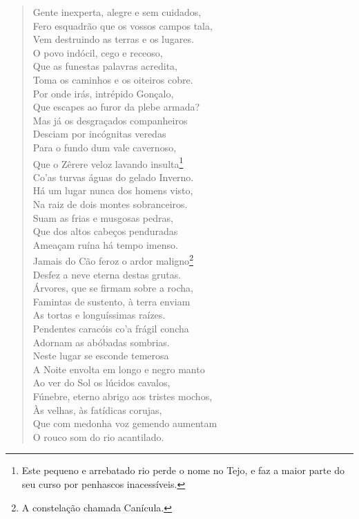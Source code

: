 \begin{verse}
Gente inexperta, alegre e sem cuidados,\\
Fero esquadrão que os vossos campos tala,\\
Vem destruindo as terras e os lugares.\\
O povo indócil, cego e receoso,\\
Que as funestas palavras acredita,\\
Toma os caminhos e os oiteiros cobre.\\
Por onde irás, intrépido Gonçalo,\\
Que escapes ao furor da plebe armada?\\
Mas já os desgraçados companheiros\\
Desciam por incógnitas veredas\\
Para o fundo dum vale cavernoso,\\
Que o Zêrere veloz lavando insulta\footnote{ Este pequeno e arrebatado
rio perde o nome no Tejo, e faz a maior parte do seu curso por penhascos inacessíveis.}\\
Co'as turvas águas do gelado Inverno.\\
Há um lugar nunca dos homens visto,\\
Na raiz de dois montes sobranceiros.\\
Suam as frias e musgosas pedras,\\
Que dos altos cabeços penduradas\\
Ameaçam ruína há tempo imenso.\\
Jamais do Cão feroz o ardor maligno\footnote{ A constelação chamada Canícula.}\\		\index{\Canic}
Desfez a neve eterna destas grutas.\\
Árvores, que se firmam sobre a rocha,\\
Famintas de sustento, à terra enviam\\
As tortas e longuíssimas raízes.\\
Pendentes caracóis co'a frágil concha\\
Adornam as abóbadas sombrias.\\
Neste lugar se esconde temerosa\\
A Noite envolta em longo e negro manto\\
Ao ver do Sol os lúcidos cavalos,\\
Fúnebre, eterno abrigo aos tristes mochos,\\		\index{\Mocho}
Às velhas, às fatídicas corujas,\\
Que com medonha voz gemendo aumentam\\
O rouco som do rio acantilado. \\[10pt]



\end{verse}
